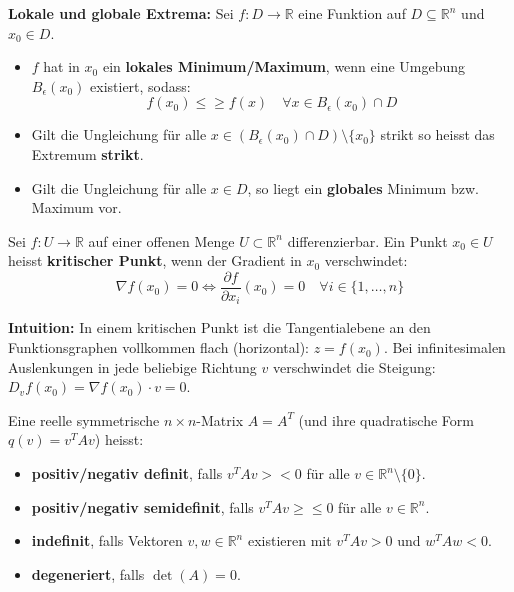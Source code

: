 \begin{definition}
    \textbf{Lokale und globale Extrema:} Sei $f: D \to \mathbb{R}$ eine Funktion auf $D \subseteq \mathbb{R}^n$ und $x_0 \in D$.
    \begin{itemize}
        \item $f$ hat in $x_0$ ein \textbf{lokales Minimum/Maximum}, wenn eine Umgebung $B_\epsilon(x_0)$ existiert, sodass:
        $$ f(x_0) \le \geq f(x) \quad \forall x \in B_\epsilon(x_0) \cap D $$
        \item Gilt die Ungleichung für alle $x \in (B_\epsilon(x_0) \cap D) \setminus \{x_0\}$ strikt so heisst das Extremum \textbf{strikt}.
        \item Gilt die Ungleichung für alle $x \in D$, so liegt ein \textbf{globales} Minimum bzw. Maximum vor.
    \end{itemize}
\end{definition}

\begin{definition}
    Sei $f: U \to \mathbb{R}$ auf einer offenen Menge $U \subset \mathbb{R}^n$ differenzierbar. Ein Punkt $x_0 \in U$ heisst \textbf{kritischer Punkt}, wenn der Gradient in $x_0$ verschwindet:
    $$ \nabla f(x_0) = 0 \iff \frac{\partial f}{\partial x_i}(x_0) = 0 \quad \forall i \in \{1, \dots, n\} $$
\end{definition}

\begin{remark}
    \textbf{Intuition:} In einem kritischen Punkt ist die Tangentialebene an den Funktionsgraphen vollkommen flach (horizontal): $z = f(x_0)$. Bei infinitesimalen Auslenkungen in jede beliebige Richtung $v$ verschwindet die Steigung: $D_v f(x_0) = \nabla f(x_0) \cdot v = 0$.
\end{remark}

\begin{definition}
    Eine reelle symmetrische $n \times n$-Matrix $A = A^T$ (und ihre quadratische Form $q(v) = v^T A v$) heisst:
    \begin{itemize}
        \item \textbf{positiv/negativ definit}, falls $v^T A v \gt \lt 0$ für alle $v \in \mathbb{R}^n \setminus \{0\}$.
        \item \textbf{positiv/negativ semidefinit}, falls $v^T A v \geq \le 0$ für alle $v \in \mathbb{R}^n$.
        \item \textbf{indefinit}, falls Vektoren $v, w \in \mathbb{R}^n$ existieren mit $v^T A v > 0$ und $w^T A w < 0$.
        \item \textbf{degeneriert}, falls $\det(A) = 0$.
    \end{itemize}
\end{definition}

